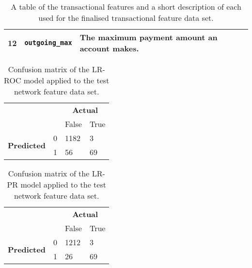 \begin{sidewaystable}[ht]
\begin{adjustbox}{scale=0.7}
\begin{tabular}{lll|lll}
12                                                                 & \texttt{outgoing\_max}                                                    & The maximum payment amount an account makes.                                                                                                                                  &                                                                    &                                                                  &                                                                                                                                                                  \\ \hline
\end{tabular}
\end{adjustbox}
\caption{A table of the transactional features and a short description of each used for the finalised transactional feature data set.}
\label{tab:ch3_trans_features}
\end{sidewaystable}


\begin{table}
\centering
\begin{tabular}{llll}
                                                        &   & \multicolumn{2}{c}{\textbf{Actual}} \\
                                                        &   & False             & True            \\ \hline
\multicolumn{1}{c}{\multirow{2}{*}{\textbf{Predicted}}} & 0 & 1182              & 3               \\
\multicolumn{1}{c}{}                                    & 1 & 56                & 69              \\ \hline
\end{tabular}
\caption{Confusion matrix of the LR-ROC model applied to the test network feature data set.}
\label{tab:ch3_cm_LR_ROC_network}
\end{table}

\begin{table}
\centering
\begin{tabular}{llll}
                                                        &   & \multicolumn{2}{c}{\textbf{Actual}} \\
                                                        &   & False             & True            \\ \hline
\multicolumn{1}{c}{\multirow{2}{*}{\textbf{Predicted}}} & 0 & 1212              & 3               \\
\multicolumn{1}{c}{}                                    & 1 & 26                & 69              \\ \hline
\end{tabular}
\caption{Confusion matrix of the LR-PR model applied to the test network feature data set.}
\label{tab:ch3_cm_LR_PR_network}
\end{table}

